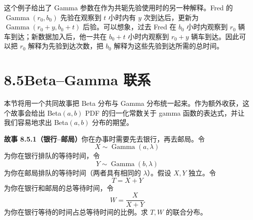 \documentclass[UTF8,12pt,a4paper,fontset=fandol]{ctexart}
\begin{document}
这个例子给出了 Gamma 参数在作为共轭先验使用时的另一种解释。Fred 的 $\operatorname{Gamma}(r_0,b_0)$ 先验在观察到 $t$ 小时内有 $y$ 次到达后，更新为 $\operatorname{Gamma}(r_0+y,b_0+t)$ 后验。可以想象，过去 Fred 在 $b_0$ 小时内观察到 $r_0$ 辆车到达；新数据加入后，他一共在 $b_0+t$ 小时内观察到 $r_0+y$ 辆车到达。因此可以把 $r_0$ 解释为先验到达次数，把 $b_0$ 解释为这些先验到达所需的总时间。

\section*{8.5\quad Beta--Gamma 联系}

本节将用一个共同故事把 Beta 分布与 Gamma 分布统一起来。作为额外收获，这个故事会给出 Beta$(a,b)$ PDF 的归一化常数关于 gamma 函数的表达式，并让我们容易地求出 Beta$(a,b)$ 分布的期望。

\noindent\textbf{故事 8.5.1（银行--邮局）}\quad 你在办事时需要先去银行，再去邮局。令
\[
  X\sim\operatorname{Gamma}(a,\lambda)
\]
为你在银行排队的等待时间，令
\[
  Y\sim\operatorname{Gamma}(b,\lambda)
\]
为你在邮局排队的等待时间（两者具有相同的 $\lambda$）。假设 $X,Y$ 独立。令
\[
  T=X+Y
\]
为你在银行和邮局的总等待时间，令
\[
  W=\frac{X}{X+Y}
\]
为你在银行等待的时间占总等待时间的比例。求 $T,W$ 的联合分布。
\end{document}
